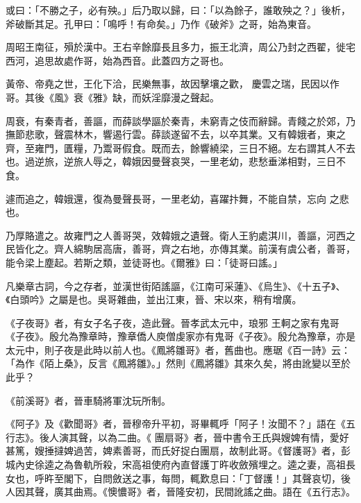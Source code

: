 \begin{pinyinscope}
 或曰：「不勝之子，必有殃。」后乃取以歸，曰：「以為餘子，誰敢殃之？」後析，斧破斷其足。孔甲曰：「鳴呼！有命矣。」乃作《破斧》之哥，始為東音。



 周昭王南征，殞於漢中。王右辛餘靡長且多力，振王北濟，周公乃封之西翟，徙宅西河，追思故處作哥，始為西音。此蓋四方之哥也。



 黃帝、帝堯之世，王化下洽，民樂無事，故因擊壤之歡，
 慶雲之瑞，民因以作哥。其後《風》衰《雅》缺，而妖淫靡漫之聲起。



 周衰，有秦青者，善謳，而薛談學謳於秦青，未窮青之伎而辭歸。青餞之於郊，乃撫節悲歌，聲震林木，響遏行雲。薛談遂留不去，以卒其業。又有韓娥者，東之齊，至雍門，匱糧，乃鬻哥假食。既而去，餘響繞梁，三日不絕。左右謂其人不去也。過逆旅，逆旅人辱之，韓娥因曼聲哀哭，一里老幼，悲愁垂涕相對，三日不食。



 遽而追之，韓娥還，復為曼聲長哥，一里老幼，喜躍抃舞，不能自禁，忘向
 之悲也。



 乃厚賂遣之。故雍門之人善哥哭，效韓娥之遺聲。衛人王豹處淇川，善謳，河西之民皆化之。齊人綿駒居高唐，善哥，齊之右地，亦傳其業。前漢有虞公者，善哥，能令梁上塵起。若斯之類，並徒哥也。《爾雅》曰：「徒哥曰謠。」



 凡樂章古詞，今之存者，並漢世街陌謠謳，《江南可采蓮》、《烏生》、《十五子》、《白頭吟》之屬是也。吳哥雜曲，並出江東，晉、宋以來，稍有增廣。



 《子夜哥》者，有女子名子夜，造此聲。晉孝武太元中，琅邪
 王軻之家有鬼哥《子夜》。殷允為豫章時，豫章僑人庾僧虔家亦有鬼哥《子夜》。殷允為豫章，亦是太元中，則子夜是此時以前人也。《鳳將雛哥》者，舊曲也。應琚《百一詩》云：「為作《陌上桑》，反言《鳳將雛》。」然則《鳳將雛》其來久矣，將由訛變以至於此乎？



 《前溪哥》者，晉車騎將軍沈玩所制。



 《阿子》及《歡聞哥》者，晉穆帝升平初，哥畢輒呼「阿子！汝聞不？」語在《五行志》。後人演其聲，以為二曲。《
 團扇哥》者，晉中書令王氏與嫂婢有情，愛好甚篤，嫂捶撻婢過苦，婢素善哥，而氏好捉白團扇，故制此哥。《督護哥》者，彭城內史徐逵之為魯軌所殺，宋高祖使府內直督護丁旿收斂殯埋之。逵之妻，高祖長女也，呼旿至閣下，自問斂送之事，每問，輒歎息曰：「丁督護！」其聲哀切，後人因其聲，廣其曲焉。《懊憹哥》者，晉隆安初，民間訛謠之曲。語在《五行志》。




\end{pinyinscope}
